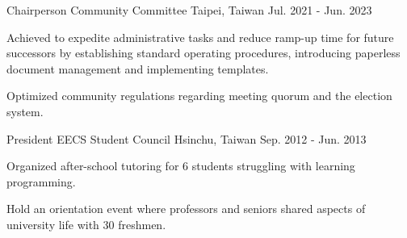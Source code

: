 

\begin{cventries}

  \cventry
    {Chairperson} %
    {Community Committee} %
    {Taipei, Taiwan} %
    {Jul. 2021 - Jun. 2023} %
    {
      \begin{cvitems} %
        \item {Achieved to expedite administrative tasks and reduce ramp-up time
          for future successors by establishing standard operating procedures,
          introducing paperless document management and implementing templates.}
        \item {Optimized community regulations regarding meeting quorum and the
          election system.}
      \end{cvitems}
    }

  \cventry
    {President} %
    {EECS Student Council} %
    {Hsinchu, Taiwan} %
    {Sep. 2012 - Jun. 2013} %
    {
      \begin{cvitems} %
        \item Organized after-school tutoring for 6 students struggling with learning programming.
        \item Hold an orientation event where professors and seniors shared
          aspects of university life with 30 freshmen.
      \end{cvitems}
    }

\end{cventries}
